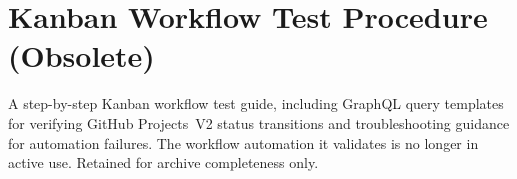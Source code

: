 
\section*{Kanban Workflow Test Procedure (Obsolete)}

A step-by-step Kanban workflow test guide, including GraphQL query templates for
verifying GitHub Projects~V2 status transitions and troubleshooting guidance for
automation failures. The workflow automation it validates is no longer in active
use. Retained for archive completeness only.
